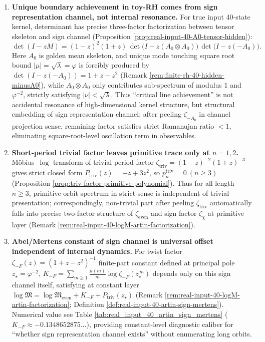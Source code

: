 \begin{enumerate}
  \item \textbf{Unique boundary achievement in toy-RH comes from sign representation channel, not internal resonance.}
  For true input 40-state kernel, determinant has precise three-factor factorization between tensor skeleton and sign channel (Proposition \ref{prop:real-input-40-A0-tensor-hidden}):
  \[
  \det(I-zM)=(1-z)^2(1+z)\,\det\!\bigl(I-z(A_0\otimes A_0)\bigr)\,\det\!\bigl(I-z(-A_0)\bigr).
  \]
  Here \(A_0\) is golden mean skeleton, and unique mode touching square root bound \(|\mu|=\sqrt{\lambda}=\varphi\) is forcibly produced by \(\det(I-z(-A_0))=1+z-z^2\) (Remark \ref{rem:finite-rh-40-hidden-minusA0}), while \(A_0\otimes A_0\) only contributes sub-spectrum of modulus \(1\) and \(\varphi^{-2}\), strictly satisfying \(|\nu|<\sqrt{\lambda}\).
  Thus ``critical line achievement'' is not accidental resonance of high-dimensional kernel structure, but structural embedding of sign representation channel; after peeling \(\zeta_{-A_0}\) in channel projection sense, remaining factor satisfies strict Ramanujan ratio \(<1\), eliminating square-root-level oscillation term in observables.

  \item \textbf{Short-period trivial factor leaves primitive trace only at \texorpdfstring{$n=1,2$}{n=1,2}.}
  M\"obius--\(\log\) transform of trivial period factor \(\zeta_{\mathrm{triv}}=(1-z)^{-2}(1+z)^{-3}\) gives strict closed form
  \(P_{\mathrm{triv}}(z)=-z+3z^2\), so \(p^{\mathrm{triv}}_n=0\ (n\ge 3)\) (Proposition \ref{prop:triv-factor-primitive-polynomial}).
  Thus for all length \(n\ge 3\), primitive orbit spectrum in strict sense is independent of trivial presentation; correspondingly, non-trivial part after peeling \(\zeta_{\mathrm{triv}}\) automatically falls into precise two-factor structure of \(\zeta_{\mathrm{even}}\) and sign factor \(\zeta_{\chi}\) at primitive layer (Remark \ref{rem:real-input-40-logM-artin-factorization}).

  \item \textbf{Abel/Mertens constant of sign channel is universal offset independent of internal dynamics.}
  For twist factor \(\zeta_{-F}(z)=(1+z-z^2)^{-1}\) finite-part constant defined at principal pole \(z_\star=\varphi^{-2}\),
  \(K_{-F}=\sum_{m\ge 1}\frac{\mu(m)}{m}\log\zeta_{-F}(z_\star^{\,m})\)
  depends only on this sign channel itself, satisfying at constant layer
  \(\log\mathfrak{M}=\log\mathfrak{M}_{\mathrm{even}}+K_{-F}+P_{\mathrm{triv}}(z_\star)\) (Remark \ref{rem:real-input-40-logM-artin-factorization}; Definition \ref{def:real-input-40-artin-sign-mertens}).
  Numerical value see Table \ref{tab:real_input_40_artin_sign_mertens} (\(K_{-F}\approx -0.1348652875\ldots\)), providing constant-level diagnostic caliber for ``whether sign representation channel exists'' without enumerating long orbits.


\end{enumerate}
